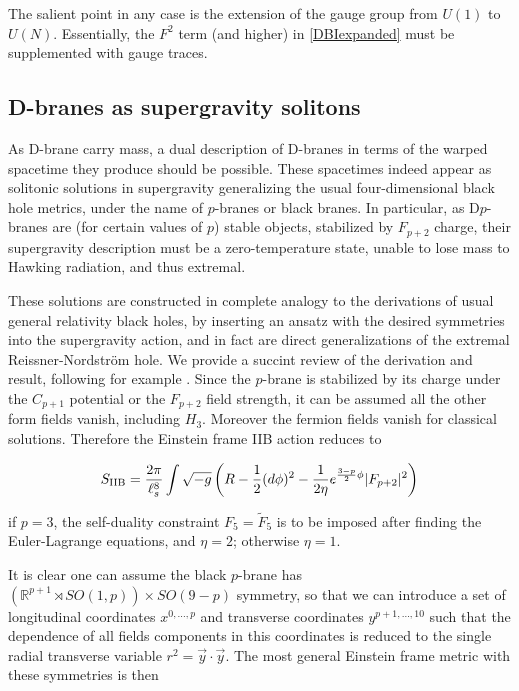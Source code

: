 The salient point in any case is the extension of the gauge group from $U(1)$ to $U(N)$. Essentially, the $F^2$ term (and higher) in \eqref{DBIexpanded} must be supplemented with gauge traces.


\subsection{D-branes as supergravity solitons}\label{sec:pbranes}

As D-brane carry mass, a dual description of D-branes in terms of the warped spacetime they produce should be possible. These spacetimes indeed appear as solitonic solutions in supergravity generalizing the usual four-dimensional black hole metrics, under the name of $p$-branes or black branes. In particular, as D$p$-branes are (for certain values of $p$) stable objects, stabilized by $F_{p+2}$ charge, their supergravity description must be a zero-temperature state, unable to lose mass to Hawking radiation, and thus extremal.

These solutions are constructed in complete analogy to the derivations of usual general relativity black holes, by inserting an ansatz with the desired symmetries into the supergravity action, and in fact are direct generalizations of the extremal Reissner-Nordstr\"om hole. We provide a succint review of the derivation and result, following for example \cite{MaldacenaDb}. Since the $p$-brane is stabilized by its charge under the $C_{p+1}$ potential or the $F_{p+2}$ field strength, it can be assumed all the other form fields vanish, including $H_3$. Moreover the fermion fields vanish for classical solutions. Therefore the Einstein frame IIB action reduces to

\begin{equation}
	S_\text{IIB} = \frac{2\pi}{\ell_s^8} \int \sqrt{-g} \left( R - \frac{1}{2}(d\phi)^2 - \frac{1}{2\eta} e^{\frac{3-p}{2} \phi} |F_{p+2}|^2 \right)
	\label{simplifaction}
\end{equation}

if $p=3$, the self-duality constraint $F_5 = \tilde F_5$ is to be imposed after finding the Euler-Lagrange equations, and $\eta = 2$; otherwise $\eta = 1$.

It is clear one can assume the black $p$-brane has $\left( \mathbb{R}^{p+1} \rtimes SO(1,p) \right)\times SO(9-p)$ symmetry, so that we can introduce a set of longitudinal coordinates $x^{0,\ldots,p}$ and transverse coordinates $y^{p+1,\ldots,10}$ such that the dependence of all fields components in this coordinates is reduced to the single radial transverse variable $r^2 = \vec y \cdot \vec y$. The most general Einstein frame metric with these symmetries is then

